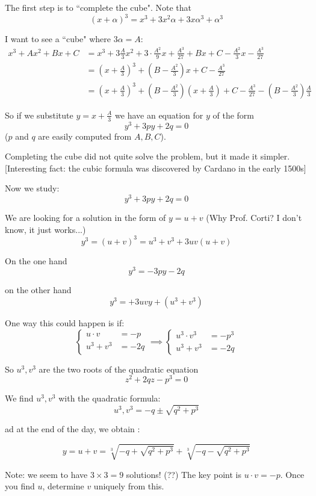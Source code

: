 \documentclass[twoside]{scrartcl}
\begin{document}
The first step is to ``complete the cube". Note that 
\[(x+ \alpha)^3 = x^3 + 3x^2 \alpha + 3x\alpha^3 + \alpha^3\]

I want to see a ``cube" where $3\alpha = A$: 
\[
\begin{aligned}
x^3 + Ax^2 + Bx + C &=   \textstyle{x^3 + 3\frac{A}{3}x^2 + 3\cdot \frac{A^2}{9}x + \frac{A^3}{27} + Bx + C - \frac{A^2}{3}x - \frac{A^3}{27}}\\[0.2cm]
  &= \textstyle{(x + \frac{A}{3})^3 + (B-\frac{A^2}{3})x + C - \frac{A^3}{27}}\\[0.2cm]
  &= \textstyle{(x + \frac{A}{3})^3 + (B - \frac{A^2}{3})(x + \frac{A}{3}) + C - \frac{A^3}{27} - (B-\frac{A^2}{3})\frac{A}{3}}
\end{aligned}
\]

So if we substitute $y = x + \frac{A}{3}$ we have an equation for $y$ of the form \[y^3 + 3py + 2q = 0\]
($p$ and $q$ are easily computed from $A,B,C$). 

Completing the cube did not quite solve the problem, but it made it simpler. 
[Interesting fact: the cubic formula was discovered by Cardano in the early 1500s]

Now we study:
\[y^3 + 3py + 2q = 0\]

We are looking for a solution in the form of $y = u + v$ (Why Prof. Corti? I don't know, it just works...)
\[y^3 = (u+v)^3 = u^3 + v^3 + 3uv(u+v)\]

On the one hand 
\[y^3 = -3py - 2q\]

on the other hand
\[y^3 = +3uvy + (u^3 + v^3)\]

One way this could happen is if: 
\[
  \begin{cases}
  u \cdot v &= -p\\
  u^3 + v^3 &= -2q	
  \end{cases}
  \implies 
\begin{cases}
u^3 \cdot v^3 &= -p^3\\
u^3 + v^3 &= -2q	
\end{cases}
\]

So $u^3, v^3$ are the two roots of the quadratic equation 
\[z^2 + 2qz -p^3= 0\]

We find $u^3,v^3$ with the quadratic formula: 
\[u^3,v^3 = -q \pm \sqrt{q^2 + p^3}\]

ad at the end of the day, we obtain :

\[y = u+ v = \sqrt[3]{-q + \sqrt{q^2 + p^3}} + \sqrt[3]{-q - \sqrt{q^2 + p^3}}\]

Note: we seem to have $3 \times 3 = 9$ solutions! (??) The key point is $u \cdot v = -p$. Once you find $u$, determine $v$ uniquely from this.\\
\end{document}
